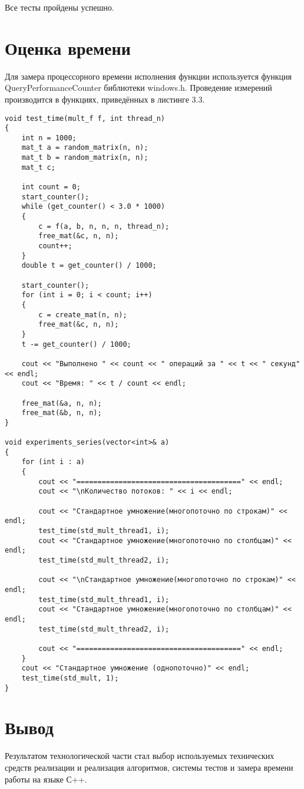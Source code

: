 Все тесты пройдены успешно.

\section{Оценка времени}
Для замера процессорного времени исполнения функции используется функция QueryPerformanceCounter библиотеки windows.h\cite{QueryPerformanceCounter}. Проведение измерений производится в функциях, приведённых в листинге 3.3.

\begin{lstlisting}[caption = {Функции замера процессорного времени работы функции}]
void test_time(mult_f f, int thread_n)
{
	int n = 1000;
	mat_t a = random_matrix(n, n);
	mat_t b = random_matrix(n, n);
	mat_t c;
	
	int count = 0;
	start_counter();
	while (get_counter() < 3.0 * 1000) 
	{
		c = f(a, b, n, n, n, thread_n);
		free_mat(&c, n, n);
		count++;
	}
	double t = get_counter() / 1000;
	
	start_counter();
	for (int i = 0; i < count; i++)
	{
		c = create_mat(n, n);
		free_mat(&c, n, n);
	}
	t -= get_counter() / 1000;
	
	cout << "Выполнено " << count << " операций за " << t << " секунд" << endl;
	cout << "Время: " << t / count << endl;
	
	free_mat(&a, n, n);
	free_mat(&b, n, n);
}

void experiments_series(vector<int>& a)
{
	for (int i : a)
	{
		cout << "=======================================" << endl;
		cout << "\nКоличество потоков: " << i << endl;
		
		cout << "Стандартное умножение(многопоточно по строкам)" << endl;
		test_time(std_mult_thread1, i);
		cout << "Стандартное умножение(многопоточно по столбцам)" << endl;
		test_time(std_mult_thread2, i);
		
		cout << "\nСтандартное умножение(многопоточно по строкам)" << endl;
		test_time(std_mult_thread1, i);
		cout << "Стандартное умножение(многопоточно по столбцам)" << endl;
		test_time(std_mult_thread2, i);
		
		cout << "=======================================" << endl;
	}
	cout << "Стандартное умножение (однопоточно)" << endl;
	test_time(std_mult, 1);
}

\end{lstlisting}

\section*{Вывод}
Результатом технологической части стал выбор используемых технических средств реализации и реализация алгоритмов, системы тестов и замера времени работы на языке С++.

